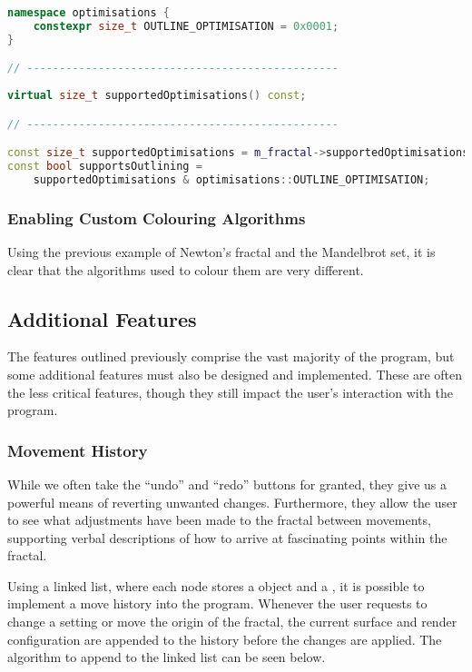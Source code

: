 \begin{lstlisting}[language=c++]
namespace optimisations {
	constexpr size_t OUTLINE_OPTIMISATION = 0x0001;
}

// ------------------------------------------------
	
virtual size_t supportedOptimisations() const;

// ------------------------------------------------

const size_t supportedOptimisations = m_fractal->supportedOptimisations();
const bool supportsOutlining =
	supportedOptimisations & optimisations::OUTLINE_OPTIMISATION;
\end{lstlisting}

\subsubsection{Enabling Custom Colouring Algorithms}

Using the previous example of Newton's fractal and the Mandelbrot set, it is clear that the algorithms used to colour them are very different. 

\subsection{Additional Features}

The features outlined previously comprise the vast majority of the program, but some additional features must also be designed and implemented. These are often the less critical features, though they still impact the user's interaction with the program.  

\subsubsection{Movement History}

While we often take the ``undo'' and ``redo'' buttons for granted, they give us a powerful means of reverting unwanted changes. Furthermore, they allow the user to see what adjustments have been made to the fractal between movements, supporting verbal descriptions of how to arrive at fascinating points within the fractal.

Using a linked list, where each node stores a  object and a , it is possible to implement a move history into the program. Whenever the user requests to change a setting or move the origin of the fractal, the current surface and render configuration are appended to the history before the changes are applied. The algorithm to append to the linked list can be seen below.

